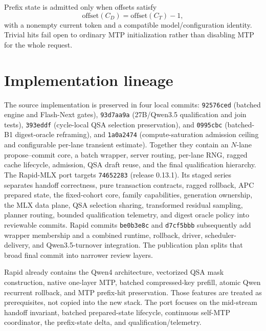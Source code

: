 \documentclass[10pt,twocolumn]{article}
\begin{document}
Prefix state is admitted only when offsets satisfy
\begin{equation}
  \mathrm{offset}(C_D)=\mathrm{offset}(C_T)-1,
\end{equation}
with a nonempty current token and a compatible model/configuration identity.
Trivial hits fail open to ordinary MTP initialization rather than disabling
MTP for the whole request.

\section{Implementation lineage}
The source implementation is preserved in four local commits:
\texttt{92576ced} (batched engine and Flash-Next gates),
\texttt{93d7aa9a} (27B/Qwen3.5 qualification and join tests),
\texttt{393eddf} (cycle-local QSA selection preservation), and
\texttt{0995cbc} (batched-B1 digest-oracle reframing), and
\texttt{1a0a2474} (compute-saturation admission ceiling and configurable
per-lane transient estimate).  Together they contain
an $N$-lane propose--commit core, a batch wrapper, server routing, per-lane RNG,
ragged cache lifecycle, admission, QSA draft reuse, and the final qualification
hierarchy.
The Rapid-MLX port targets \texttt{74652283} (release 0.13.1).  Its staged
series separates handoff correctness, pure transaction contracts, ragged
rollback, APC prepared state, the fixed-cohort core, family capabilities,
generation ownership, the MLX data plane, QSA selection sharing, transformed
residual sampling, planner routing, bounded qualification telemetry, and digest
oracle policy into reviewable commits.  Rapid commits \texttt{be0b3e8c} and
\texttt{d7cf5bbb} subsequently add wrapper membership and a combined runtime,
rollback, driver, scheduler-delivery, and Qwen3.5-turnover integration.  The
publication plan splits that broad final commit into narrower review layers.

Rapid already contains the Qwen4 architecture, vectorized QSA mask
construction, native one-layer MTP, batched compressed-key prefill, atomic
Qwen recurrent rollback, and MTP prefix-hit preservation.  Those features are
treated as prerequisites, not copied into the new stack.  The port focuses on
the mid-stream handoff invariant, batched prepared-state lifecycle, continuous
self-MTP coordinator, the prefix-state delta, and qualification/telemetry.
\end{document}
